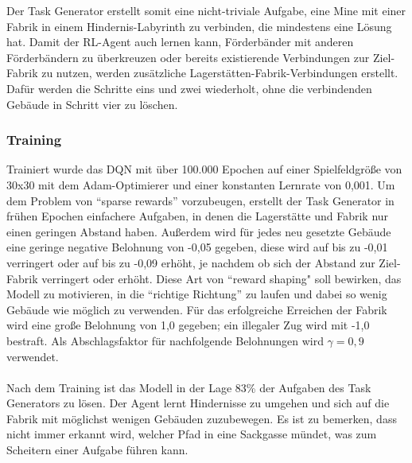 Der Task Generator erstellt somit eine nicht-triviale Aufgabe, eine Mine mit einer Fabrik in einem Hindernis-Labyrinth zu verbinden, die mindestens eine Lösung hat.
Damit der RL-Agent auch lernen kann, Förderbänder mit anderen Förderbändern zu überkreuzen oder bereits existierende Verbindungen zur Ziel-Fabrik zu nutzen, werden zusätzliche Lagerstätten-Fabrik-Verbindungen erstellt. Dafür werden die Schritte eins und zwei wiederholt, ohne die verbindenden Gebäude in Schritt vier zu löschen.

\subsubsection{Training}
Trainiert wurde das DQN  mit über 100.000 Epochen auf einer Spielfeldgröße von 30x30 mit dem Adam-Optimierer und einer konstanten Lernrate von 0,001. Um dem Problem von “sparse rewards” vorzubeugen, erstellt der Task Generator in frühen Epochen einfachere Aufgaben, in denen die Lagerstätte und Fabrik nur einen geringen Abstand haben. Außerdem wird für jedes neu gesetzte Gebäude eine geringe negative Belohnung von -0,05 gegeben, diese wird auf bis zu -0,01 verringert oder auf bis zu -0,09 erhöht, je nachdem ob sich der Abstand zur Ziel-Fabrik verringert oder erhöht. Diese Art von “reward shaping" soll bewirken, das Modell zu motivieren, in die “richtige Richtung” zu laufen und dabei so wenig Gebäude wie möglich zu verwenden. Für das erfolgreiche Erreichen der Fabrik wird eine große Belohnung von 1,0 gegeben; ein illegaler Zug wird mit -1,0 bestraft. Als Abschlagsfaktor für nachfolgende Belohnungen wird $\gamma=0,9$ verwendet.
\\\\
Nach dem Training ist das Modell in der Lage 83\% der Aufgaben des Task Generators zu lösen. Der Agent lernt Hindernisse zu umgehen und sich auf die Fabrik mit möglichst wenigen Gebäuden zuzubewegen. Es ist zu bemerken, dass nicht immer erkannt wird, welcher Pfad in eine Sackgasse mündet, was zum Scheitern einer Aufgabe führen kann.

